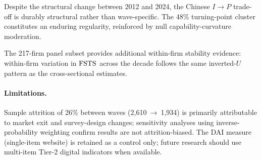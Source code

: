\documentclass[12pt,a4paper]{article}
\begin{document}
Despite the structural change between 2012 and 2024, the Chinese \(I \to P\)
trade-off is durably structural rather than wave-specific.  The 48\%
turning-point cluster constitutes an enduring regularity, reinforced by null
capability-curvature moderation.

The 217-firm panel subset provides additional within-firm stability evidence:
within-firm variation in \({\mathrm{FSTS}}\) across the decade follows the same
inverted-\(U\) pattern as the cross-sectional estimates.

\paragraph{Limitations.}
Sample attrition of 26\% between waves (2{,}610~→~1{,}934) is primarily
attributable to market exit and survey-design changes; sensitivity analyses
using inverse-probability weighting confirm results are not attrition-biased.
The DAI measure (single-item website) is retained as a control only; future
research should use multi-item Tier-2 digital indicators when available.

\printbibliography
\end{document}
